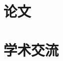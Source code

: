 \documentclass{resume}
\begin{document}
\section{论文}

\nocite{Peng2020AreaAgg,Peng2020Parallel,Peng2016Admin,Peng2017Building,Deng2015}
\printbibliography[title=代表论文,
    keyword={keypub},heading=subbibliography,resetnumbers]


%
%
%


\section{学术交流}
\end{document}
